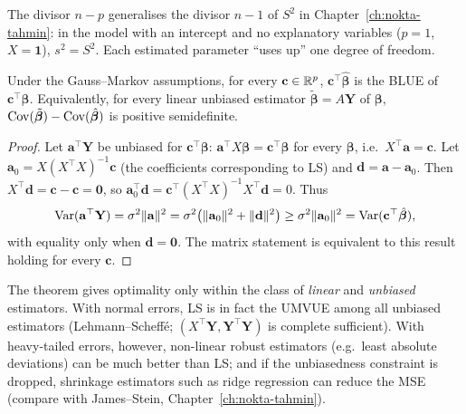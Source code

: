 \documentclass[main.tex]{subfiles}
\begin{document}
\begin{remark}
The divisor $n-p$ generalises the divisor $n-1$ of $S^2$ in Chapter~\ref{ch:nokta-tahmin}: in the model with an intercept and no explanatory variables ($p=1$, $X=\mathbf 1$), $s^2=S^2$. Each estimated parameter ``uses up'' one degree of freedom.
\end{remark}

\begin{theorem}\label{thm:gauss-markov}
Under the Gauss--Markov assumptions, for every $\mathbf c\in\mathbb{R}^p$, $\mathbf c^\top\hat{\bm\beta}$ is the BLUE of $\mathbf c^\top\bm\beta$. Equivalently, for every linear unbiased estimator $\tilde{\bm\beta}=A\mathbf Y$ of $\bm\beta$, $\operatorname{Cov}(\tilde{\bm\beta})-\operatorname{Cov}(\hat{\bm\beta})$ is positive semidefinite.
\end{theorem}
\begin{proof}
Let $\mathbf a^\top\mathbf Y$ be unbiased for $\mathbf c^\top\bm\beta$: $\mathbf a^\top X\bm\beta=\mathbf c^\top\bm\beta$ for every $\bm\beta$, i.e.\ $X^\top\mathbf a=\mathbf c$. Let $\mathbf a_0=X(X^\top X)^{-1}\mathbf c$ (the coefficients corresponding to LS) and $\mathbf d=\mathbf a-\mathbf a_0$. Then $X^\top\mathbf d=\mathbf c-\mathbf c=\mathbf 0$, so $\mathbf a_0^\top\mathbf d=\mathbf c^\top(X^\top X)^{-1}X^\top\mathbf d=0$. Thus
\[
\operatorname{Var}(\mathbf a^\top\mathbf Y)=\sigma^2\|\mathbf a\|^2=\sigma^2\big(\|\mathbf a_0\|^2+\|\mathbf d\|^2\big)\ge\sigma^2\|\mathbf a_0\|^2=\operatorname{Var}(\mathbf c^\top\hat{\bm\beta}),
\]
with equality only when $\mathbf d=\mathbf 0$. The matrix statement is equivalent to this result holding for every $\mathbf c$.
\end{proof}

\begin{remark}
The theorem gives optimality only within the class of \emph{linear} and \emph{unbiased} estimators. With normal errors, LS is in fact the UMVUE among all unbiased estimators (Lehmann--Scheffé; $(X^\top\mathbf Y,\mathbf Y^\top\mathbf Y)$ is complete sufficient). With heavy-tailed errors, however, non-linear robust estimators (e.g.\ least absolute deviations) can be much better than LS; and if the unbiasedness constraint is dropped, shrinkage estimators such as ridge regression can reduce the MSE (compare with James--Stein, Chapter~\ref{ch:nokta-tahmin}).
\end{remark}
\end{document}
